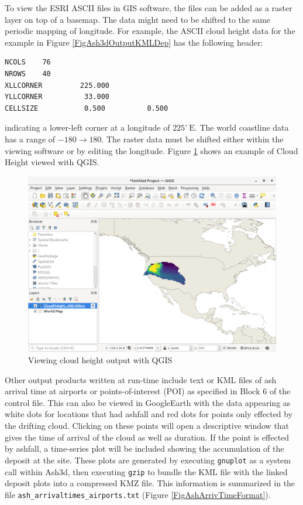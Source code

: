 To view the ESRI ASCII files in GIS software, the files can be added as a raster layer
on top of a basemap. The data might need to be shifted to the same periodic mapping
of longitude.  For example, the ASCII cloud height data for the example in Figure \ref{FigAsh3dOutputKMLDep}
has the following header:
\small
\begin{verbatim}
NCOLS    76
NROWS    40
XLLCORNER         225.000
YLLCORNER          33.000
CELLSIZE           0.500          0.500
\end{verbatim}
\normalsize
indicating a lower-left corner at a longitude of $225^{\circ} \, \mathrm{E}$.
The world coastline data has a range of $-180 \rightarrow 180$. The raster data must
be shifted either within the viewing software or by editing the longitude. Figure
\ref{FigAsh3dOutputQgisCH} shows an example of Cloud Height viewed with QGIS.
\begin{figure}[htbp]
\includegraphics[angle=0,scale=0.35]{Figures/Ash3dOutput_ESRICloudHeight_QGIS.png}
\parbox{15cm}{\caption{\label{FigAsh3dOutputQgisCH}
Viewing cloud height output with QGIS}}
\end{figure}

Other output products written at run-time include text or KML files of ash arrival
time at airports or
points-of-interest (POI) as specified in Block 6 of the control file.
This can also be viewed in GoogleEarth with the data appearing as white dots for locations
that had ashfall and red dots for points only effected by the drifting cloud. Clicking on
these points will open a descriptive window that gives the time of arrival of the cloud
as well as duration.  If the point is effected by ashfall, a time-series plot will be
included showing the accumulation of the deposit at the site. These plots are generated
by executing \texttt{gnuplot} as a system call within Ash3d, then executing \texttt{gzip}
to bundle the KML file with the linked deposit plots into a compressed KMZ file. This
information is summarized in the file \texttt{ash\_arrivaltimes\_airports.txt}
(Figure \ref{FigAshArrivTimeFormat}).

